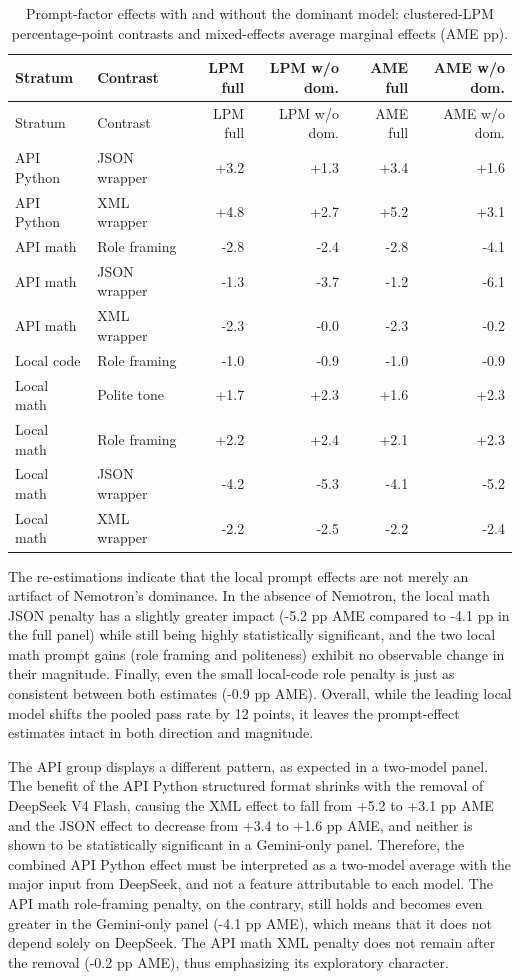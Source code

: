 {\small
\setlength{\tabcolsep}{3.5pt}
\begin{longtable}[]{@{}llrrrr@{}}
\caption{Prompt-factor effects with and without the dominant model: clustered-LPM percentage-point contrasts and mixed-effects average marginal effects (AME pp).}\label{tab:dominant-effects}\tabularnewline
\toprule\noalign{}
Stratum & Contrast & LPM full & LPM w/o dom. & AME full & AME w/o dom. \\
\midrule\noalign{}
\endfirsthead
\toprule\noalign{}
Stratum & Contrast & LPM full & LPM w/o dom. & AME full & AME w/o dom. \\
\midrule\noalign{}
\endhead
\bottomrule\noalign{}
\endlastfoot
API Python & JSON wrapper & +3.2 & +1.3 & +3.4 & +1.6 \\
API Python & XML wrapper & +4.8 & +2.7 & +5.2 & +3.1 \\
API math & Role framing & -2.8 & -2.4 & -2.8 & -4.1 \\
API math & JSON wrapper & -1.3 & -3.7 & -1.2 & -6.1 \\
API math & XML wrapper & -2.3 & -0.0 & -2.3 & -0.2 \\
Local code & Role framing & -1.0 & -0.9 & -1.0 & -0.9 \\
Local math & Polite tone & +1.7 & +2.3 & +1.6 & +2.3 \\
Local math & Role framing & +2.2 & +2.4 & +2.1 & +2.3 \\
Local math & JSON wrapper & -4.2 & -5.3 & -4.1 & -5.2 \\
Local math & XML wrapper & -2.2 & -2.5 & -2.2 & -2.4 \\
\end{longtable}
}

The re-estimations indicate that the local prompt effects are not merely an artifact of Nemotron's dominance. In the absence of Nemotron, the local math JSON penalty has a slightly greater impact (-5.2 pp AME compared to -4.1 pp in the full panel) while still being highly statistically significant, and the two local math prompt gains (role framing and politeness) exhibit no observable change in their magnitude. Finally, even the small local-code role penalty is just as consistent between both estimates (-0.9 pp AME). Overall, while the leading local model shifts the pooled pass rate by 12 points, it leaves the prompt-effect estimates intact in both direction and magnitude.

The API group displays a different pattern, as expected in a two-model panel. The benefit of the API Python structured format shrinks with the removal of DeepSeek V4 Flash, causing the XML effect to fall from +5.2 to +3.1 pp AME and the JSON effect to decrease from +3.4 to +1.6 pp AME, and neither is shown to be statistically significant in a Gemini-only panel. Therefore, the combined API Python effect must be interpreted as a two-model average with the major input from DeepSeek, and not a feature attributable to each model. The API math role-framing penalty, on the contrary, still holds and becomes even greater in the Gemini-only panel (-4.1 pp AME), which means that it does not depend solely on DeepSeek. The API math XML penalty does not remain after the removal (-0.2 pp AME), thus emphasizing its exploratory character.

